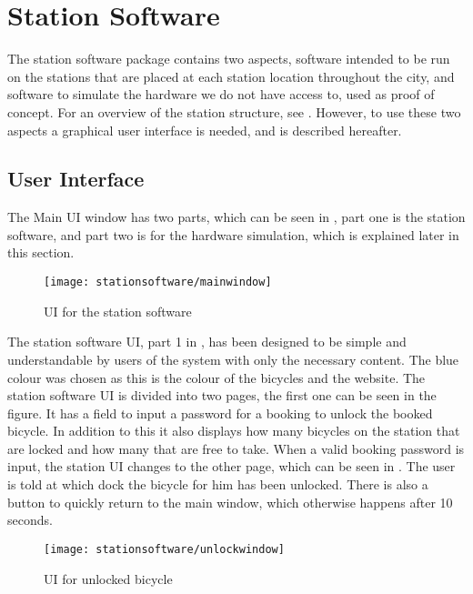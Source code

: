 \section{Station Software}
The station software package contains two aspects, software intended to be run on the stations that are placed at each station location throughout the city, and software to simulate the hardware we do not have access to, used as proof of concept.
For an overview of the station structure, see . 
However, to use these two aspects a graphical user interface is needed, and is described hereafter.

\subsection{User Interface}
The Main UI window has two parts, which can be seen in , part one is the station software, and part two is for the hardware simulation, which is explained later in this section.

\begin{figure}[h]
	\centering
	\texttt{[image: stationsoftware/mainwindow]}
	\caption{UI for the station software}\label{fig:stationMain}
\end{figure}

The station software UI, part 1 in , has been designed to be simple and understandable by users of the system with only the necessary content.
The blue colour was chosen as this is the colour of the bicycles and the \bycykel website.
The station software UI is divided into two pages, the first one can be seen in the figure.
It has a field to input a password for a booking to unlock the booked bicycle.
In addition to this it also displays how many bicycles on the station that are locked and how many that are free to take.
When a valid booking password is input, the station UI changes to the other page, which can be seen in .
The user is told at which dock the bicycle for him has been unlocked.
There is also a button to quickly return to the main window, which otherwise happens after 10 seconds.

\begin{figure}[h]
	\centering
	\texttt{[image: stationsoftware/unlockwindow]}
	\caption{UI for unlocked bicycle}\label{fig:bicycleUnlock}
\end{figure}

